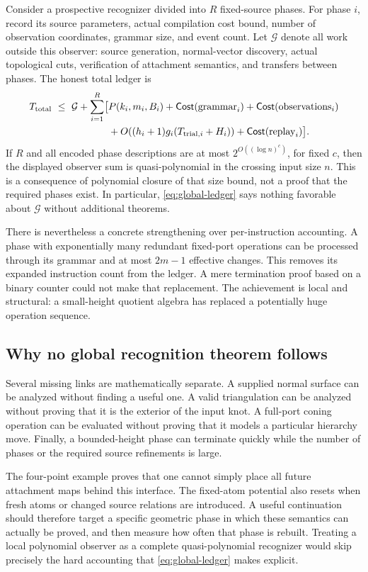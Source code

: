 Consider a prospective recognizer divided into $R$ fixed-source phases.
For phase $i$, record its source parameters, actual compilation cost bound,
number of observation coordinates, grammar size, and event count. Let
$\mathcal G$ denote all work outside this observer: source generation,
normal-vector discovery, actual topological cuts, verification of attachment
semantics, and transfers between phases. The honest total ledger is
\begin{align}
 T_{\rm total}\ \le\ \mathcal G+
 \sum_{i=1}^{R}\bigl[&P(k_i,m_i,B_i)+\mathsf{Cost}(\text{grammar}_i)
 +\mathsf{Cost}(\text{observations}_i)\notag\\
 &+O((h_i+1)g_i(T_{{\rm trial},i}+H_i))
 +\mathsf{Cost}(\text{replay}_i)\bigr].
 \label{eq:global-ledger}
\end{align}
If $R$ and all encoded phase descriptions are at most
$2^{O((\log n)^c)}$, for fixed $c$, then the displayed observer sum is
quasi-polynomial in the crossing input size $n$. This is a consequence of
polynomial closure of that size bound, not a proof that the required
phases exist. In particular, \eqref{eq:global-ledger} says nothing favorable
about $\mathcal G$ without additional theorems.

There is nevertheless a concrete strengthening over per-instruction
accounting. A phase with exponentially many redundant fixed-port operations
can be processed through its grammar and at most $2m-1$ effective changes.
This removes its expanded instruction count from the ledger. A mere
termination proof based on a binary counter could not make that replacement.
The achievement is local and structural: a small-height quotient algebra
has replaced a potentially huge operation sequence.

\subsection{Why no global recognition theorem follows}

Several missing links are mathematically separate. A supplied normal surface
can be analyzed without finding a useful one. A valid triangulation can be
analyzed without proving that it is the exterior of the input knot. A
full-port coning operation can be evaluated without proving that it models
a particular hierarchy move. Finally, a bounded-height phase can terminate
quickly while the number of phases or the required source refinements is
large.

The four-point example proves that one cannot simply place all future
attachment maps behind this interface. The fixed-atom potential also resets
when fresh atoms or changed source relations are introduced. A useful
continuation should therefore target a specific geometric phase in which
these semantics can actually be proved, and then measure how often that
phase is rebuilt. Treating a local polynomial observer as a complete
quasi-polynomial recognizer would skip precisely the hard accounting that
\eqref{eq:global-ledger} makes explicit.
